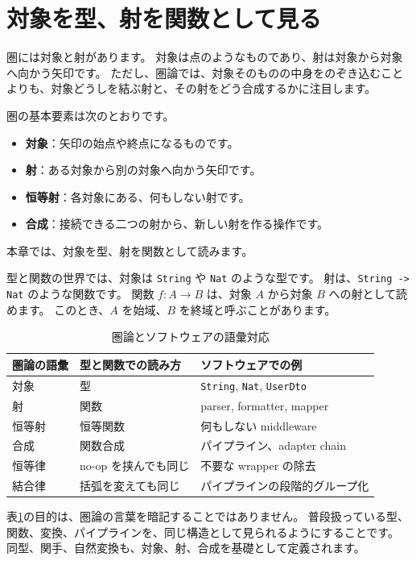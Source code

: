 \section{対象を型、射を関数として見る}

圏には対象と射があります。
対象は点のようなものであり、射は対象から対象へ向かう矢印です。
ただし、圏論では、対象そのものの中身をのぞき込むことよりも、対象どうしを結ぶ射と、その射をどう合成するかに注目します。

圏の基本要素は次のとおりです。
\begin{itemize}
\item \textbf{対象}：矢印の始点や終点になるものです。
\item \textbf{射}：ある対象から別の対象へ向かう矢印です。
\item \textbf{恒等射}：各対象にある、何もしない射です。
\item \textbf{合成}：接続できる二つの射から、新しい射を作る操作です。
\end{itemize}
本章では、対象を型、射を関数として読みます。

型と関数の世界では、対象は \texttt{String} や \texttt{Nat} のような型です。
射は、\texttt{String -> Nat} のような関数です。
関数 \(f : A \to B\) は、対象 \(A\) から対象 \(B\) への射として読めます。
このとき、\(A\) を始域、\(B\) を終域と呼ぶことがあります。

\begin{table}[htbp]
\centering
\begin{tabular}{lll}
\toprule
圏論の語彙 & 型と関数での読み方 & ソフトウェアでの例 \\
\midrule
対象 & 型 & \texttt{String}, \texttt{Nat}, \texttt{UserDto} \\
射 & 関数 & parser, formatter, mapper \\
恒等射 & 恒等関数 & 何もしない middleware \\
合成 & 関数合成 & パイプライン、adapter chain \\
恒等律 & no-op を挟んでも同じ & 不要な wrapper の除去 \\
結合律 & 括弧を変えても同じ & パイプラインの段階的グループ化 \\
\bottomrule
\end{tabular}
\caption{圏論とソフトウェアの語彙対応}
\label{tab:ch11-vocabulary}
\end{table}

表\ref{tab:ch11-vocabulary}の目的は、圏論の言葉を暗記することではありません。
普段扱っている型、関数、変換、パイプラインを、同じ構造として見られるようにすることです。
同型、関手、自然変換も、対象、射、合成を基礎として定義されます。

